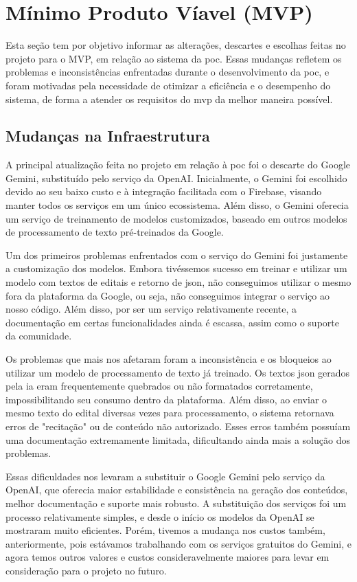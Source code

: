\section{Mínimo Produto Víavel (MVP)}

Esta seção tem por objetivo informar as alterações, descartes e escolhas feitas no projeto para o MVP, em relação ao sistema da \acs{poc}. Essas mudanças refletem os problemas e inconsistências enfrentadas durante o desenvolvimento da \acs{poc}, e foram motivadas pela necessidade de otimizar a eficiência e o desempenho do sistema, de forma a atender os requisitos do \acs{mvp} da melhor maneira possível.

\subsection{Mudanças na Infraestrutura}
 
A principal atualização feita no projeto em relação à \acs{poc} foi o descarte do Google Gemini, substituído pelo serviço da OpenAI. Inicialmente, o Gemini foi escolhido devido ao seu baixo custo e à integração facilitada com o Firebase, visando manter todos os serviços em um único ecossistema. Além disso, o Gemini oferecia um serviço de treinamento de modelos customizados, baseado em outros modelos de processamento de texto pré-treinados da Google.
 
Um dos primeiros problemas enfrentados com o serviço do Gemini foi justamente a customização dos modelos. Embora tivéssemos sucesso em treinar e utilizar um modelo com textos de editais e retorno de \acs{json}, não conseguimos utilizar o mesmo fora da plataforma da Google, ou seja, não conseguimos integrar o serviço ao nosso código. Além disso, por ser um serviço relativamente recente, a documentação em certas funcionalidades ainda é escassa, assim como o suporte da comunidade.
 
Os problemas que mais nos afetaram foram a inconsistência e os bloqueios ao utilizar um modelo de processamento de texto já treinado. Os textos \acs{json} gerados pela \acs{ia} eram frequentemente quebrados ou não formatados corretamente, impossibilitando seu consumo dentro da plataforma. Além disso, ao enviar o mesmo texto do edital diversas vezes para processamento, o sistema retornava erros de "recitação" ou de conteúdo não autorizado. Esses erros também possuíam uma documentação extremamente limitada, dificultando ainda mais a solução dos problemas.
 
Essas dificuldades nos levaram a substituir o Google Gemini pelo serviço da OpenAI, que oferecia maior estabilidade e consistência na geração dos conteúdos, melhor documentação e suporte mais robusto. A substituição dos serviços foi um processo relativamente simples, e desde o início os modelos da OpenAI se mostraram muito eficientes. Porém, tivemos a mudança nos custos também, anteriormente, pois estávamos trabalhando com os serviços gratuitos do Gemini, e agora temos outros valores e custos consideravelmente maiores para levar em consideração para o projeto no futuro.
 

